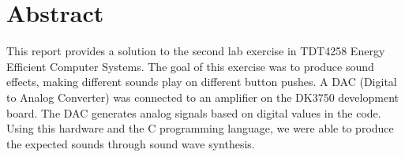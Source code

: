 \section{Abstract}

This report provides a solution to the second lab exercise in TDT4258 Energy Efficient Computer Systems.
The goal of this exercise was to produce sound effects, making different sounds play on different button pushes.
A DAC (Digital to Analog Converter) was connected to an amplifier on the DK3750 development board. The DAC generates analog signals based on digital values in the code. Using this hardware and the C programming language, we were able to produce the expected sounds through sound wave synthesis.
